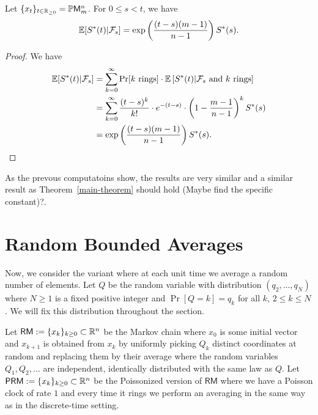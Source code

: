 \documentclass[12pt]{article}
\begin{document}
\begin{cor}
	Let $\{x_t\}_{t \in \mathbb{R}_{\geq 0}} = \mathbb{P} \mathsf{M}_m^n$. For $0 \leq s < t$, we have 
	\[
		\mathbb{E} [S^*(t) | \mathcal{F}_s] = \exp \left ( \frac{(t-s)(m-1)}{n-1} \right ) S^*(s).	
	\]
\end{cor}
\begin{proof}
	We have 
	\begin{align*}
		\mathbb{E} [ S^*(t) | \mathcal{F}_s ] & = \sum_{k = 0}^\infty \Pr[k \text{ rings}] \cdot \mathbb{E} \left [ S^*(t) | \mathcal{F}_s \text{ and } k \text{ rings} \right ] \\
		& = \sum_{k = 0}^\infty \frac{(t-s)^k}{k!} \cdot e^{-(t-s)} \cdot \left ( 1 - \frac{m-1}{n-1} \right )^k S^*(s) \\
		& = \exp \left ( \frac{(t-s)(m-1)}{n-1} \right ) S^*(s). 
	\end{align*}
\end{proof}

As the prevous computatoins show, the results are very similar and a similar result as Theorem~\ref{main-theorem} should hold (Maybe find the specific constant)?.

\section{Random Bounded Averages}

Now, we consider the variant where at each unit time we average a random number of elements. Let $Q$ be the random variable with distribution $(q_2, \ldots, q_N)$ where $N \geq 1$ is a fixed positive integer and $\Pr[Q = k] = q_k$ for all $k$, $2 \leq k \leq N$. We will fix this distribution throughout the section. 

\begin{defn}
	Let $\mathsf{RM} := \{x_k\}_{k \geq 0} \subset \mathbb{R}^n$ be the Markov chain where $x_0$ is some initial vector and $x_{k+1}$ is obtained from $x_k$ by uniformly picking $Q_k$ distinct coordinates at random and replacing them by their average where the random variables $Q_1, Q_2, \ldots$ are independent, identically distributed with the same law as $Q$. Let $\mathsf{PRM} := \{x_k\}_{k \geq 0} \subset \mathbb{R}^n$ be the Poissonized version of $\mathsf{RM}$ where we have a Poisson clock of rate $1$ and every time it rings we perform an averaging in the same way as in the discrete-time setting. 
\end{defn} 
\end{document}
